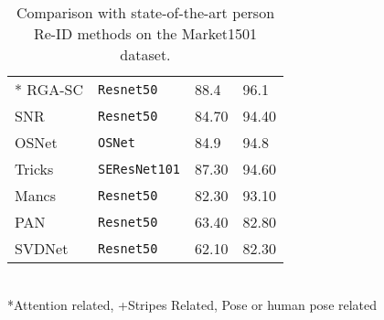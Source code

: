 \documentclass[final]{cvpr}
\begin{document}
\begin{table}[]
\begin{tabular}{@{}l|l|ll@{}}
* RGA-SC \cite{zhang2020relation} & \texttt{Resnet50} & 88.4 & 96.1 \\
SNR \cite{jin2020style} & \texttt{Resnet50} & 84.70 & 94.40 \\
OSNet \cite{zhou2019omni} &\texttt{OSNet} & 84.9 & 94.8 \\
Tricks \cite{luo2019bag}                                                                 & \texttt{SEResNet101} & 87.30          & 94.60  \\
 Mancs \cite{wang2018mancs}                                                                 & \texttt{Resnet50}    & 82.30          & 93.10  \\
PAN  \cite{zheng2018pedestrian}                                                                  & \texttt{Resnet50}    & 63.40          & 82.80  \\
SVDNet \cite{sun2017svdnet}                                                                 & \texttt{Resnet50}    & 62.10          & 82.30  \\ \bottomrule

\end{tabular}
\\ *Attention related, +Stripes Related, \texttildelow Pose or human pose related
\caption{Comparison with state-of-the-art person Re-ID methods
on the Market1501 dataset.}
\label{tab:market}
\end{table}
\end{document}
